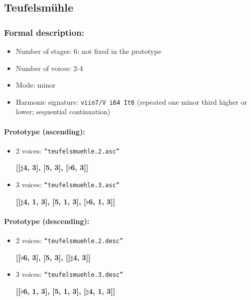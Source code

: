 \documentclass[11pt, openany]{article}
\begin{document}
	\subsection{Teufelsm\"uhle}
	
\subsubsection{Formal description:}
\begin{itemize}
\item Number of stages: 6; not fixed in the prototype
\item Number of voices: 2-4
\item Mode: minor
\item Harmonic signature: \texttt{viio7/V i64 It6} (repeated one minor third higher or lower; sequential continuation)
\end{itemize}

\paragraph{Prototype (ascending):}
\begin{itemize}
\item 2 voices: \texttt{“teufelsmuehle.2.asc”}
	\begin{center}
	\textbf{[[$\sharp$4, 3], [5, 3], [$\flat$6, 3]]}
	\end{center}
\item 3 voices: \texttt{“teufelsmuehle.3.asc”}
	\begin{center}
	\textbf{[[$\sharp$4, 1, 3], [5, 1, 3], [$\flat$6, 1, 3]]}
	\end{center}
\end{itemize}

\paragraph{Prototype (descending):}
\begin{itemize}
\item 2 voices: \texttt{“teufelsmuehle.2.desc”}
	\begin{center}
	\textbf{[[$\flat$6, 3], [5, 3], [[$\sharp$4, 3]]}
	\end{center}
\item 3 voices: \texttt{“teufelsmuehle.3.desc”}
	\begin{center}
	\textbf{[[$\flat$6, 1, 3], [5, 1, 3], [$\sharp$4, 1, 3]]}
	\end{center}
\end{itemize}
\end{document}

